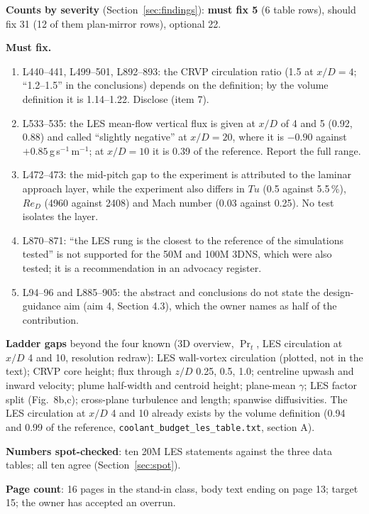 \documentclass[10pt]{article}
\begin{document}
\textbf{Counts by severity} (Section~\ref{sec:findings}): \textbf{must fix 5} (6 table rows), should fix 31 (12 of
them plan-mirror rows), optional 22.

\textbf{Must fix.}
\begin{enumerate}[label=M\arabic*]
\item L440--441, L499--501, L892--893: the CRVP circulation ratio (1.5 at $x/D=4$; ``1.2--1.5'' in the
conclusions) depends on the definition; by the volume definition it is 1.14--1.22. Disclose (item 7).
\item L533--535: the LES mean-flow vertical flux is given at $x/D$ of 4 and 5 (0.92, 0.88) and called ``slightly
negative'' at $x/D=20$, where it is $-0.90$ against $+0.85$\,g\,s$^{-1}$\,m$^{-1}$; at $x/D=10$ it is 0.39 of the
reference. Report the full range.
\item L472--473: the mid-pitch gap to the experiment is attributed to the laminar approach layer, while the
experiment also differs in $\mathit{Tu}$ (0.5 against 5.5\,\%), $\mathit{Re}_D$ (4960 against 2408) and Mach
number (0.03 against 0.25). No test isolates the layer.
\item L870--871: ``the LES rung is the closest to the reference of the simulations tested'' is not supported for
the 50M and 100M 3DNS, which were also tested; it is a recommendation in an advocacy register.
\item L94--96 and L885--905: the abstract and conclusions do not state the design-guidance aim (aim 4, Section
4.3), which the owner names as half of the contribution.
\end{enumerate}

\textbf{Ladder gaps} beyond the four known (3D overview, $\Pr_t$, LES circulation at $x/D$ 4 and 10, resolution
redraw): LES wall-vortex circulation (plotted, not in the text); CRVP core height; flux through $z/D$ 0.25, 0.5,
1.0; centreline upwash and inward velocity; plume half-width and centroid height; plane-mean $\gamma$; LES factor
split (Fig.~8b,c); cross-plane turbulence and length; spanwise diffusivities. The LES circulation at $x/D$ 4 and 10
already exists by the volume definition (0.94 and 0.99 of the reference, \texttt{coolant\_budget\_les\_table.txt},
section A).

\textbf{Numbers spot-checked}: ten 20M LES statements against the three data tables; all ten agree
(Section~\ref{sec:spot}).

\textbf{Page count}: 16 pages in the stand-in class, body text ending on page 13; target 15; the owner has
accepted an overrun.
\end{document}
